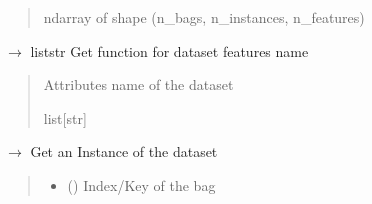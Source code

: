 \documentclass[letterpaper,10pt,english]{sphinxmanual}
\begin{document}
\begin{fulllineitems}
\begin{fulllineitems}
\begin{quote}
\begin{description}
\sphinxAtStartPar
ndarray of shape (n\_bags, n\_instances, n\_features)

\end{description}\end{quote}

\end{fulllineitems}


\begin{fulllineitems}
\label{\detokenize{data/_autosummary/miml.data.miml_dataset.MIMLDataset:miml.data.miml_dataset.MIMLDataset.get_features_name}}
\pysigstartsignatures
\pysiglinewithargsret
{}
{}
{{ $\rightarrow$ list\DUrole{p}{{[}}str\DUrole{p}{{]}}}}
\pysigstopsignatures
\sphinxAtStartPar
Get function for dataset features name
\begin{quote}\begin{description}
\sphinxAtStartPar
{} \textendash{} Attributes name of the dataset

\sphinxAtStartPar
list{[}str{]}

\end{description}\end{quote}

\end{fulllineitems}


\begin{fulllineitems}
\label{\detokenize{data/_autosummary/miml.data.miml_dataset.MIMLDataset:miml.data.miml_dataset.MIMLDataset.get_instance}}
\pysigstartsignatures
\pysiglinewithargsret
{}
{\sphinxparamcomma {}}
{{ $\rightarrow$ {\hyperref[\detokenize{data/_autosummary/miml.data.instance.Instance:miml.data.instance.Instance}]{}}}}
\pysigstopsignatures
\sphinxAtStartPar
Get an Instance of the dataset
\begin{quote}\begin{description}
\begin{itemize}
\item {} 
\sphinxAtStartPar
{} () \textendash{} Index/Key of the bag


\end{itemize}
\end{description}
\end{quote}
\end{fulllineitems}
\end{fulllineitems}
\end{document}
